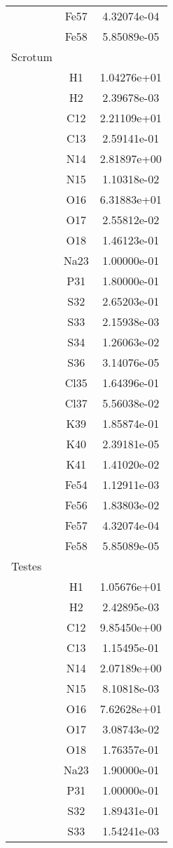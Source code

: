 \begin{centering}
\begin{longtable}{l c c}
& Fe57 & 4.32074e-04 \\ 
& Fe58 & 5.85089e-05 \\ 
\hline
Scrotum & & \\
\hline
& H1 & 1.04276e+01 \\ 
& H2 & 2.39678e-03 \\ 
& C12 & 2.21109e+01 \\ 
& C13 & 2.59141e-01 \\ 
& N14 & 2.81897e+00 \\ 
& N15 & 1.10318e-02 \\ 
& O16 & 6.31883e+01 \\ 
& O17 & 2.55812e-02 \\ 
& O18 & 1.46123e-01 \\ 
& Na23 & 1.00000e-01 \\ 
& P31 & 1.80000e-01 \\ 
& S32 & 2.65203e-01 \\ 
& S33 & 2.15938e-03 \\ 
& S34 & 1.26063e-02 \\ 
& S36 & 3.14076e-05 \\ 
& Cl35 & 1.64396e-01 \\ 
& Cl37 & 5.56038e-02 \\ 
& K39 & 1.85874e-01 \\ 
& K40 & 2.39181e-05 \\ 
& K41 & 1.41020e-02 \\ 
& Fe54 & 1.12911e-03 \\ 
& Fe56 & 1.83803e-02 \\ 
& Fe57 & 4.32074e-04 \\ 
& Fe58 & 5.85089e-05 \\ 
\hline
Testes & & \\
\hline
& H1 & 1.05676e+01 \\ 
& H2 & 2.42895e-03 \\ 
& C12 & 9.85450e+00 \\ 
& C13 & 1.15495e-01 \\ 
& N14 & 2.07189e+00 \\ 
& N15 & 8.10818e-03 \\ 
& O16 & 7.62628e+01 \\ 
& O17 & 3.08743e-02 \\ 
& O18 & 1.76357e-01 \\ 
& Na23 & 1.90000e-01 \\ 
& P31 & 1.00000e-01 \\ 
& S32 & 1.89431e-01 \\ 
& S33 & 1.54241e-03 \\ 

\end{longtable}
\end{centering}
